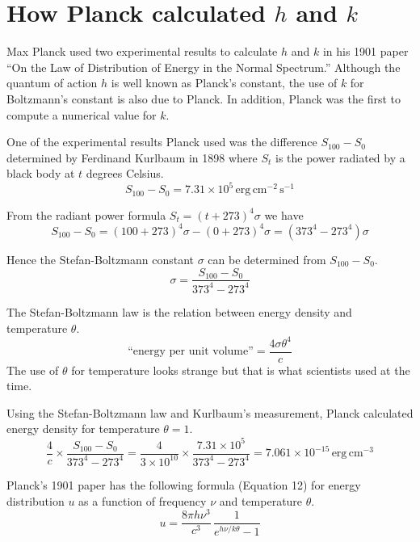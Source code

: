 

\section*{How Planck calculated $h$ and $k$}

Max Planck used two experimental results to calculate $h$ and $k$ in his 1901 paper
``On the Law of Distribution of Energy in the Normal Spectrum.''
Although the quantum of action $h$ is well known as Planck's constant,
the use of $k$ for Boltzmann's constant is also due to Planck.
In addition, Planck was the first to compute a numerical value for $k$.

\bigskip
One of the experimental results Planck used was the difference $S_{100}-S_0$
determined by Ferdinand Kurlbaum in 1898 where
$S_t$ is the power radiated by a black body at $t$ degrees Celsius.
\begin{equation*}
S_{100}-S_0=7.31\times10^5\,\text{erg}\,\text{cm}^{-2}\,\text{s}^{-1}
\end{equation*}

From the radiant power formula $S_t=(t+273)^4\sigma$ we have
\begin{equation*}
S_{100}-S_0=(100+273)^4\sigma-(0+273)^4\sigma=(373^4-273^4)\sigma
\end{equation*}

Hence the Stefan-Boltzmann constant $\sigma$ can be determined from $S_{100}-S_0$.
\begin{equation*}
\sigma=\frac{S_{100}-S_0}{373^4-273^4}%
\end{equation*}

The Stefan-Boltzmann law is the relation between energy density and temperature $\theta$.
\begin{equation*}
\text{``energy per unit volume''}=\frac{4\sigma \theta^4}{c}
\end{equation*}
The use of $\theta$ for temperature looks strange but that is what scientists used at the time.

\bigskip
Using the Stefan-Boltzmann law and Kurlbaum's measurement,
Planck calculated energy density for temperature $\theta=1$.
\begin{equation*}
\frac{4}{c}\times
\frac{S_{100}-S_0}{373^4-273^4}
=\frac{4}{3\times10^{10}}\times\frac{7.31\times10^5}{373^4-273^4}
=7.061\times10^{-15}\,\text{erg}\,\text{cm}^{-3}
\end{equation*}

Planck's 1901 paper has the following formula (Equation 12) for energy distribution
$u$ as a function of frequency $\nu$ and temperature $\theta$.
\begin{equation*}
u=\frac{8\pi h\nu^3}{c^3}\,\frac{1}{e^{h\nu/k\theta}-1}
\end{equation*}

